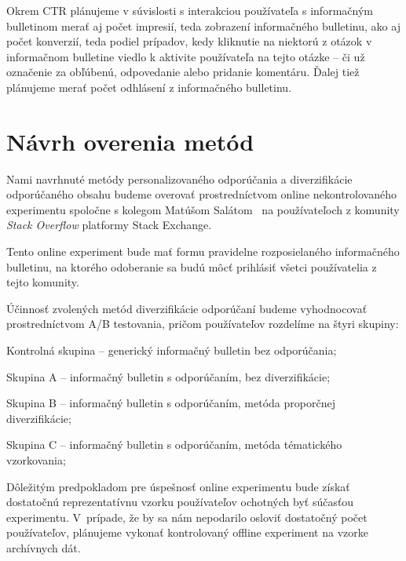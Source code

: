 Okrem CTR plánujeme v súvislosti s interakciou používateľa s informačným bulletinom merať aj počet impresií,
teda zobrazení informačného bulletinu, ako aj počet konverzií, teda podiel prípadov, kedy kliknutie na niektorú z otázok
v informačnom bulletine viedlo k aktivite používateľa na tejto otázke -- či už označenie za obľúbenú,
odpovedanie alebo pridanie komentáru. Ďalej tiež plánujeme merať počet odhlásení z informačného bulletinu.


\section{Návrh overenia metód}

Nami navrhnuté metódy personalizovaného odporúčania a diverzifikácie odporúčaného obsahu budeme overovať prostredníctvom
online nekontrolovaného experimentu spoločne s kolegom Matúšom Salátom~\cite{Salat2018} na používateľoch z komunity \textit{Stack Overflow} platformy Stack Exchange.

Tento online experiment bude mať formu pravidelne rozposielaného informačného bulletinu, na ktorého odoberanie sa budú
môcť prihlásiť všetci používatelia z tejto komunity.

Účinnosť zvolených metód diverzifikácie odporúčaní budeme vyhodnocovať prostredníctvom A/B testovania, pričom používateľov
rozdelíme na štyri skupiny:
\begin{my_enumerate}
    \item{Kontrolná skupina -- generický informačný bulletin bez odporúčania;}
    \item{Skupina A -- informačný bulletin s odporúčaním, bez diverzifikácie;}
    \item{Skupina B -- informačný bulletin s odporúčaním, metóda proporčnej diverzifikácie;}
    \item{Skupina C -- informačný bulletin s odporúčaním, metóda tématického vzorkovania;}
\end{my_enumerate}

Dôležitým predpokladom pre úspešnosť online experimentu bude získať dostatočnú reprezentatívnu vzorku používateľov
ochotných byť súčasťou experimentu. V~prípade, že by sa nám nepodarilo osloviť dostatočný počet používateľov, plánujeme
vykonať kontrolovaný offline experiment na vzorke archívnych dát.


